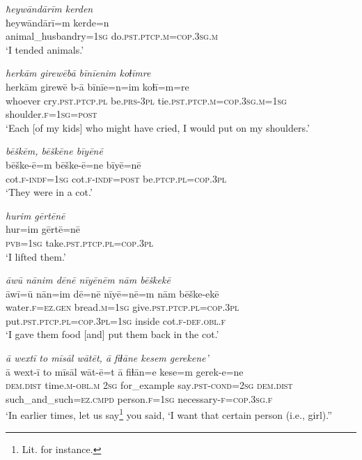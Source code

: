 \ea \label{ŽE.63}
\textit{ħeywāndārīm kerden} \\ 
\gll ħeywāndārī=m kerde=n \\ 
 animal\_husbandry\textsc{=\textsc{1sg}} do\textsc{.pst}\textsc{.ptcp}\textsc{.m}\textsc{=cop}\textsc{.3sg}\textsc{.m} \\ 
\glt `I tended animals.'
\z 
 
\ea \label{ŽE.64}
\textit{herkām girewēbā bīnīenim koɫīmre} \\ 
\gll herkām girewē b-ā bīnīe=n=im koɫī=m=re \\ 
 whoever cry\textsc{.pst}\textsc{.ptcp}\textsc{.pl} be\textsc{.prs}\textsc{-3pl} tie\textsc{.pst}\textsc{.ptcp}\textsc{.m}\textsc{=cop}\textsc{.3sg}\textsc{.m}\textsc{=\textsc{1sg}} shoulder\textsc{.f}\textsc{=\textsc{1sg}}\textsc{=\textsc{post}} \\ 
\glt `Each [of my kids] who might have cried, I would put on my shoulders.'
\z 
 
\ea \label{ŽE.65}
\textit{bēškēm, bēškēne bīyēnē} \\ 
\gll bēške-ē=m bēške-ē=ne bīyē=nē \\ 
 cot\textsc{.f}\textsc{-indf}\textsc{=\textsc{1sg}} cot\textsc{.f}\textsc{-indf}\textsc{=\textsc{post}} be\textsc{.ptcp}\textsc{.pl}\textsc{=cop}\textsc{.3pl} \\ 
\glt `They were in a cot.'
\z 
 
\ea \label{ŽE.66}
\textit{hurim gērtēnē} \\ 
\gll hur=im gērtē=nē \\ 
 \textsc{pvb}\textsc{=\textsc{1sg}} take\textsc{.pst}\textsc{.ptcp}\textsc{.pl}\textsc{=cop}\textsc{.3pl} \\ 
\glt `I lifted them.'
\z 
 
\ea \label{ŽE.67}
\textit{āwū nānim dēnē nīyēnēm nām bēškekē} \\ 
\gll āwī=ū nān=im dē=nē nīyē=nē=m nām bēške-ekē \\ 
 water\textsc{.f}\textsc{\textsc{=ez.gen}} bread\textsc{.m}\textsc{=\textsc{1sg}} give\textsc{.pst}\textsc{.ptcp}\textsc{.pl}\textsc{=cop}\textsc{.3pl} put\textsc{.pst}\textsc{.ptcp}\textsc{.pl}\textsc{=cop}\textsc{.3pl}\textsc{=\textsc{1sg}} inside cot\textsc{.f}\textsc{-def}\textsc{.obl}\textsc{.f} \\ 
\glt `I gave them food [and] put them back in the cot.'
\z 
 
\ea \label{ŽE.73}
\textit{ā wextī to mīsāl wātēt, ā fiɫāne kesem gerekene’} \\ 
\gll ā wext-ī to mīsāl wāt-ē=t ā fiɫān=e kese=m gerek-e=ne \\ 
 \textsc{dem.dist} time\textsc{.m}\textsc{-obl}\textsc{.m} \textsc{2sg} for\_example say\textsc{.pst}\textsc{-cond}\textsc{=\textsc{2sg}} \textsc{dem.dist} such\_and\_such\textsc{=ez}\textsc{.cmpd} person\textsc{.f}\textsc{=\textsc{1sg}} necessary\textsc{-f}\textsc{=cop}\textsc{.3sg}\textsc{.f} \\ 
\glt `In earlier times, let us say\footnote{Lit. for instance.} you said, ‘I want that certain person (i.e., girl).''
\z 
 
